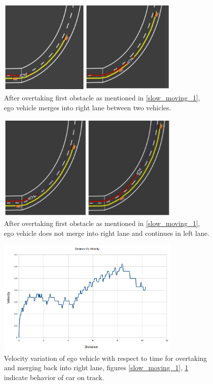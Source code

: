 \begin{figure}
	\centering
	\includegraphics[width=0.8\textwidth]{Images/evaluation/merging_1.jpg}
	\caption{After overtaking first obstacle as mentioned in \ref{slow_moving_1}, ego vehicle merges into right lane between two vehicles.}
	\label{merging_1}
\end{figure}

\begin{figure}
	\centering
	\includegraphics[width=0.8\textwidth]{Images/evaluation/no_merging.jpg}
	\caption{After overtaking first obstacle as mentioned in \ref{slow_moving_1}, ego vehicle does not merge into right lane and continues in left lane.}
	\label{no_merge}
\end{figure}


\begin{figure}
	\centering
	\includegraphics[width=0.8\textwidth]{Images/evaluation/overtaking_dist_vel.png}
	\caption{Velocity variation of ego vehicle with respect to time for overtaking and merging back into right lane, figures \ref{slow_moving_1}, \ref{merging_1} indicate behavior of car on track.}
	\label{time_vel}
\end{figure}



